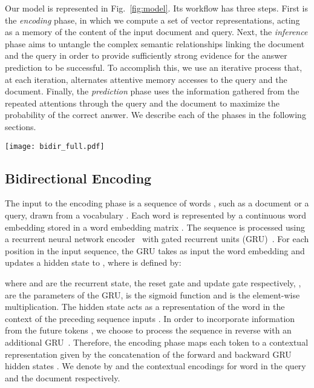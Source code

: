 \documentclass[11pt]{article}
\begin{document}
Our model is represented in Fig.~\ref{fig:model}. Its workflow has three steps.
First is the \emph{encoding} phase, in which we compute a set of vector representations, acting as a memory of the content of the input document and query.
Next, the \emph{inference} phase aims to untangle the complex semantic relationships linking the document and the query in order to provide sufficiently strong evidence for the answer prediction to be successful.
To accomplish this, we use an iterative process that, at each iteration, alternates attentive memory accesses to the query and the document.
Finally, the \emph{prediction} phase uses the information gathered from the repeated attentions through the query and the document to maximize the probability of the correct answer.
We describe each of the phases in the following sections.



\begin{figure*}[t]
    \centering
    \texttt{[image: bidir\_full.pdf]}
    \caption{Our model first encodes the query and the document by means of bidirectional GRU networks. Then, it deploys an iterative inference mechanism that alternates between attending query encodings (1) and document encodings (2) given the query attended state. The results of the alternating attention is gated and fed back into the inference GRU. Even if the encodings are computed only once, the query representation is dynamic and changes throughout the inference process. After a fixed number of steps , the weights of the document attention are used to estimate the probability of the answer .}
    \label{fig:model}
\end{figure*}

\subsection{Bidirectional Encoding}
The input to the encoding phase is a sequence of words , such as a document or a query, drawn from a vocabulary .
Each word is represented by a continuous word embedding  stored in a word embedding matrix .
The sequence  is processed using a recurrent neural network encoder~\cite{bengio_book} with gated recurrent units (GRU)~\cite{GRU}. For each position  in the input sequence, the GRU takes as input the word embedding  and updates a hidden state  to , where  is defined by:

where  and  are the recurrent state, the reset gate and update gate respectively, ,  are the parameters of the GRU,  is the sigmoid function and  is the element-wise multiplication.
The hidden state  acts as a representation of the word  in the context of the preceding sequence inputs . In order to incorporate information from the future tokens , we choose to process the sequence in reverse with an additional GRU~\cite{watson}.
Therefore, the encoding phase maps each token  to a contextual representation given by the concatenation of the forward and backward GRU hidden states . We denote by  and  the contextual encodings for word  in the query  and the document  respectively.
\end{document}

